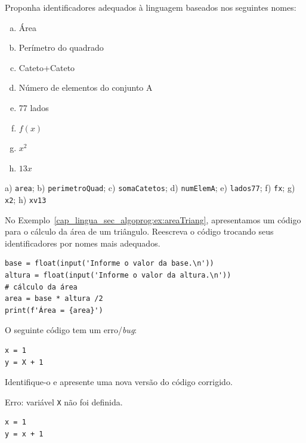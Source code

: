 \begin{exer}
  Proponha identificadores adequados à linguagem {\python} baseados nos seguintes nomes:
  \begin{enumerate}[a)]
  \item Área
  \item Perímetro do quadrado
  \item Cateto+Cateto
  \item Número de elementos do conjunto A
  \item 77 lados
  \item $f(x)$
  \item $x^2$
  \item $13x$
  \end{enumerate}
\end{exer}
\begin{resp}
  a) \lstinline+area+; b) \lstinline+perimetroQuad+; c) \lstinline+somaCatetos+; d) \lstinline+numElemA+; e) \lstinline+lados77+; f) \lstinline+fx+; g) \lstinline+x2+; h) \lstinline+xv13+
\end{resp}

\begin{exer}
  No Exemplo~\ref{cap_lingua_sec_algoprog:ex:areaTriang}, apresentamos um código {\python} para o cálculo da área de um triângulo. Reescreva o código trocando seus identificadores por nomes mais adequados.
\end{exer}
\begin{resp}

\begin{lstlisting}
base = float(input('Informe o valor da base.\n'))
altura = float(input('Informe o valor da altura.\n'))
# cálculo da área
area = base * altura /2
print(f'Área = {area}')
\end{lstlisting}

\end{resp}

\begin{exer}
  O seguinte código {\python} tem um erro/\textit{bug}:

\begin{lstlisting}
x = 1
y = X + 1
\end{lstlisting}

  Identifique-o e apresente uma nova versão do código corrigido.
\end{exer}
\begin{resp}
  Erro: variável \texttt{X} não foi definida.

\begin{lstlisting}
x = 1
y = x + 1
\end{lstlisting}

\end{resp}


